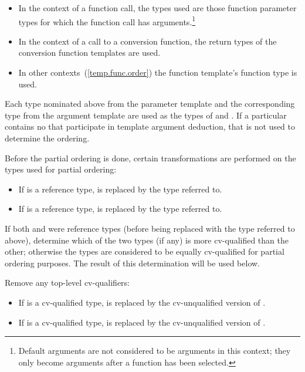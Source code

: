\begin{itemize}
\item
In the context of a function call, the types used are those function parameter types
for which the function call has arguments.\footnote{Default arguments
are not considered to be arguments in this context; they only become arguments
after a function has been selected.}
\item
In the context of a call to a conversion function, the return types of
the conversion function templates are used.
\item
In other contexts~(\ref{temp.func.order}) the function template's function
type is used.
\end{itemize}

\pnum
Each type nominated above from the parameter template and the corresponding type from the
argument template are used as the types of
and
.
If a particular  contains no 
that participate in template argument deduction, that  is not
used to determine the ordering.

\pnum
Before the partial ordering is done, certain transformations are performed
on the types used for partial ordering:

\begin{itemize}
\item
If
is a reference type,
is replaced by the type referred to.
\item
If
is a reference type,
is replaced by the type referred to.
\end{itemize}

\pnum
If both
and
were reference types (before being replaced with the type referred to
above), determine which of the two types (if any) is more cv-qualified
than the other; otherwise the types are considered to be equally
cv-qualified for partial ordering purposes. The result of this
determination will be used below.

\pnum
Remove any top-level cv-qualifiers:
\begin{itemize}
\item
If
is a cv-qualified type,
is replaced by the cv-unqualified version of
.
\item
If
is a cv-qualified type,
is replaced by the cv-unqualified version of
.
\end{itemize}


